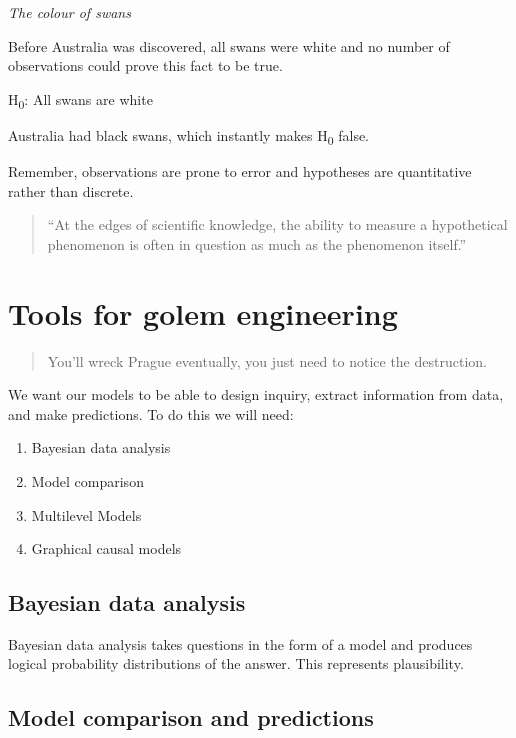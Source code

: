 \documentclass[
]{book}
\providecommand{\tightlist}{%
  \setlength{\itemsep}{0pt}\setlength{\parskip}{0pt}}
\theoremstyle{definition}
\theoremstyle{definition}
\theoremstyle{definition}
\theoremstyle{definition}
\theoremstyle{remark}
\begin{document}
\emph{The colour of swans}

Before Australia was discovered, all swans were white and no number of observations could prove this fact to be true.

H\textsubscript{0}: All swans are white

Australia had black swans, which instantly makes H\textsubscript{0} false.

Remember, observations are prone to error and hypotheses are quantitative rather than discrete.

\begin{quote}
``At the edges of scientific knowledge, the ability to measure a hypothetical phenomenon is often in question as much as the phenomenon itself.''
\end{quote}

\hypertarget{tools-for-golem-engineering}{%
\section{Tools for golem engineering}\label{tools-for-golem-engineering}}

\begin{quote}
You'll wreck Prague eventually, you just need to notice the destruction.
\end{quote}

We want our models to be able to design inquiry, extract information from data, and make predictions. To do this we will need:

\begin{enumerate}
\def\labelenumi{\arabic{enumi}.}
\tightlist
\item
  Bayesian data analysis
\item
  Model comparison
\item
  Multilevel Models
\item
  Graphical causal models
\end{enumerate}

\hypertarget{bayesian-data-analysis}{%
\subsection{Bayesian data analysis}\label{bayesian-data-analysis}}

Bayesian data analysis takes questions in the form of a model and produces logical probability distributions of the answer. This represents plausibility.

\hypertarget{model-comparison-and-predictions}{%
\subsection{Model comparison and predictions}\label{model-comparison-and-predictions}}
\end{document}
